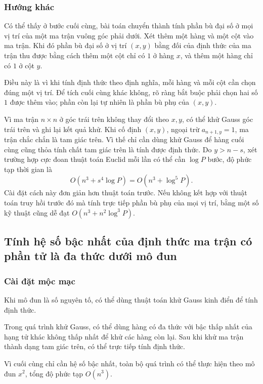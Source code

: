 \documentclass[11pt]{article}
\begin{document}
\subsubsection{Hướng khác}

Có thể thấy ở bước cuối cùng, bài toán chuyển thành tính phần bù đại số ở mọi vị
trí của một ma trận vuông góc phải dưới. Xét thêm một hàng và một cột vào ma
trận. Khi đó phần bù đại số ở vị trí \((x,y)\) bằng đối của định thức của ma
trận thu được bằng cách thêm một cột chỉ có \(1\) ở hàng \(x\), và thêm một hàng
chỉ có \(1\) ở cột \(y\).

Điều này là vì khi tính định thức theo định nghĩa, mỗi hàng và mỗi cột cần chọn
đúng một vị trí. Để tích cuối cùng khác không, rõ ràng bắt buộc phải chọn hai số
\(1\) được thêm vào; phần còn lại tự nhiên là phần bù phụ của \((x,y)\).

Vì ma trận \(n\times n\) ở góc trái trên không thay đổi theo \(x,y\), có thể khử
Gauss góc trái trên và ghi lại kết quả khử. Khi cố định \((x,y)\), ngoại trừ
\(a_{n+1,y}=1\), ma trận chắc chắn là tam giác trên. Vì thế chỉ cần dùng khử
Gauss để hàng cuối cùng cũng thỏa tính chất tam giác trên là tính được định
thức. Do \(y>n-s\), xét trường hợp cực đoan thuật toán Euclid mỗi lần có thể cần
\(\log P\) bước, độ phức tạp thời gian là
\[
  O(n^3+s^4\log P)=O(n^3+\log^5 P).
\]
Cài đặt cách này đơn giản hơn thuật toán trước. Nếu không kết hợp với thuật toán
truy hồi trước đó mà tính trực tiếp phần bù phụ của mọi vị trí, bằng một số kỹ
thuật cũng dễ đạt \(O(n^3+n^2\log^3 P)\).

\subsection{Tính hệ số bậc nhất của định thức ma trận có phần tử là đa thức dưới mô đun}

\subsubsection{Cài đặt mộc mạc}

Khi mô đun là số nguyên tố, có thể dùng thuật toán khử Gauss kinh điển để tính
định thức.

Trong quá trình khử Gauss, có thể dùng hàng có đa thức với bậc thấp nhất của
hạng tử khác không thấp nhất để khử các hàng còn lại. Sau khi khử ma trận thành
dạng tam giác trên, có thể trực tiếp tính định thức.

Vì cuối cùng chỉ cần hệ số bậc nhất, toàn bộ quá trình có thể thực hiện theo mô
đun \(x^2\), tổng độ phức tạp \(O(n^3)\).
\end{document}
